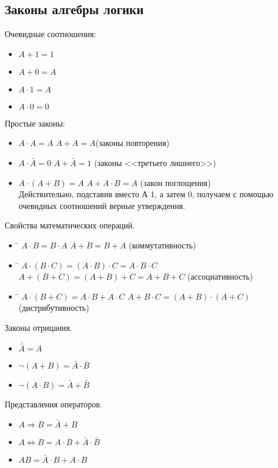 \documentclass[a4paper, fleqn]{article}
\begin{document}
	\subsection*{Законы алгебры логики}
	Очевидные соотношения:
	\begin{itemize}
		\item $A+1 = 1$
		\item $A+0=A$
		\item $A\cdot1=A$
		\item $A\cdot0=0$
	\end{itemize}
	Простые законы:
	\begin{itemize}
		\item $A\cdot A = A$ \qquad $ A + A = A$(законы повторения)
		\item $A\cdot\bar{A}=0$ \qquad $A + \bar{A} = 1$ (законы <<третьего лишнего>>)
		\item $A\cdot(A+B)=A$ $A+A\cdot B=A$ (закон поглощения)\\
		Действительно, подставив вместо А 1, а затем 0, получаем с помощью очевидных соотношений верные утверждения.
	\end{itemize}
	Свойства математических операций.
		\begin{itemize}
			\item \begin{tabbing}
				\hspace{6cm}\=\kill
				$A\cdot B=B\cdot A$ \> $A+B=B+A$ (коммутативность)
			\end{tabbing}
			\item \begin{tabbing}
				\hspace{6cm}\=\kill
				$A\cdot(B\cdot C)= (A\cdot B)\cdot C = A\cdot B\cdot C$ \> $A+(B+C)=(A+B)+C=A+B+C$ (ассоциативность)
			\end{tabbing}
			\item \begin{tabbing}
				\hspace{6cm}\=\kill
				$A\cdot(B+C)=A\cdot B+A\cdot C$ \> $A+B\cdot C = (A+B)\cdot(A+C)$  (дистрибутивность)
			\end{tabbing}	
		\end{itemize}
	Законы отрицания.
	\begin{itemize}
		\item $\bar{\bar{A}}=A$
		\item $\neg(A+B)=\bar{A}\cdot\bar{B}$
		\item $\neg(A\cdot B)=\bar{A}+\bar{B}$
	\end{itemize}
	Представления операторов.
	\begin{itemize}
		\item $A \Rightarrow B = \bar{A} + B$
		\item $A \Leftrightarrow B = A\cdot B + \bar{A}\cdot \bar{B}$
		\item $A B = \bar{A}\cdot B + A\cdot B$
	\end{itemize}
	
\end{document}
